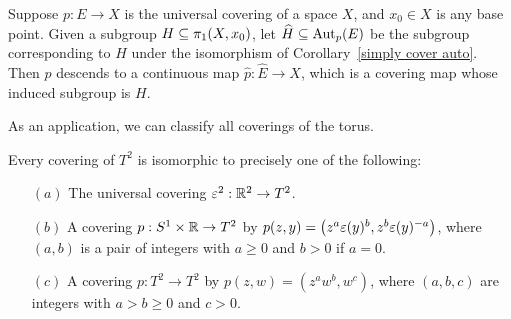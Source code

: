 \begin{corollary}
Suppose $p:E\to X$ is the universal covering of a space $X$, and $x_0\in X$ is any base point. Given a subgroup $H\subseteq\pi_1(X,x_0)$, let $\widehat{H}\subseteq\mathrm{Aut}_p(E)$ be
the subgroup corresponding to $H$ under the isomorphism of Corollary~\ref{simply cover auto}. Then $p$ descends to a continuous map $\widehat{p}:\widehat{E}\to X$, which is a covering map whose induced subgroup is $H$.
\end{corollary}
As an application, we can classify all coverings of the torus.
\begin{proposition}
Every covering of $T^2$ is isomorphic to precisely one of the following:
\begin{itemize}
\item[$(a)$] The universal covering $\varepsilon^2:\mathbb{R}^2\to T^2$.
\item[$(b)$] A covering $p:S^1\times\mathbb{R}\to T^2$ by $p(z,y)=\big(z^a\varepsilon(y)^b,z^b\varepsilon(y)^{-a}\big)$, where $(a,b)$ is a pair of integers with $a\geq0$ and $b>0$ if $a=0$.
\item[$(c)$] A covering $p:T^2\to T^2$ by $p(z,w)=(z^aw^b,w^c)$, where $(a,b,c)$ are integers with $a>b\geq0$ and $c>0$.
\end{itemize}
\end{proposition}

